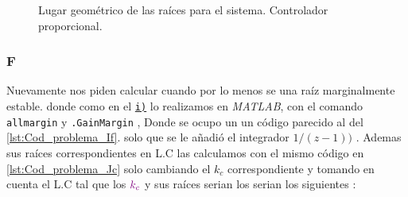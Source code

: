 \begin{figure}[ht]
\centering

\caption{Lugar geométrico de las raíces para el sistema. Controlador proporcional.}
\label{fig:lgr-j}
\end{figure}

\FloatBarrier
\subsubsection{F}%
Nuevamente nos piden calcular cuando por lo menos se una raíz marginalmente estable. donde como en el \hyperref[pregunta-i]{\texttt{i)}} lo realizamos en \textit{MATLAB}, con el comando \verb|allmargin|  y  \verb|.GainMargin| ,  Donde se ocupo un un código parecido al del \autoref{lst:Cod_problema_If}. solo que se le añadió el integrador \(1 /(z-1))\) . Ademas sus raíces correspondientes en L.C las calculamos con el mismo código en \autoref{lst:Cod_problema_Jc} solo cambiando el \(k_c\) correspondiente y tomando en cuenta el L.C tal que los \( \mathbin{\color{violet}k_c}\) y sus raíces serian los  serian los siguientes : 

